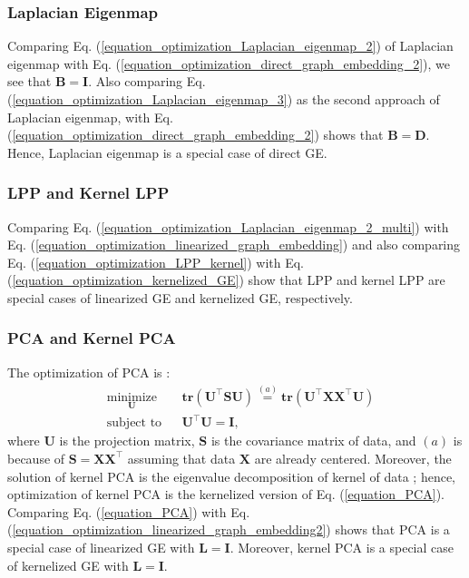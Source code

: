 \documentclass[lang=cn,10pt]{gorgeousnbook}
\numberwithin{equation}{section}%
\numberwithin{figure}{section}%
\begin{document}
\subsubsection{Laplacian Eigenmap}

Comparing Eq. (\ref{equation_optimization_Laplacian_eigenmap_2}) of Laplacian eigenmap with Eq. (\ref{equation_optimization_direct_graph_embedding_2}), we see that $\boldsymbol{B} = \boldsymbol{I}$. Also comparing Eq. (\ref{equation_optimization_Laplacian_eigenmap_3}) as the second approach of Laplacian eigenmap, with Eq. (\ref{equation_optimization_direct_graph_embedding_2}) shows that $\boldsymbol{B} = \boldsymbol{D}$. Hence, Laplacian eigenmap is a special case of direct GE.

\subsubsection{LPP and Kernel LPP}

Comparing Eq. (\ref{equation_optimization_Laplacian_eigenmap_2_multi}) with Eq. (\ref{equation_optimization_linearized_graph_embedding}) and also comparing Eq. (\ref{equation_optimization_LPP_kernel}) with Eq. (\ref{equation_optimization_kernelized_GE}) show that LPP and kernel LPP are special cases of linearized GE and kernelized GE, respectively. 

\subsubsection{PCA and Kernel PCA}

The optimization of PCA is \cite{ghojogh2019unsupervised}:
\begin{equation}\label{equation_PCA}
\begin{aligned}
& \underset{\boldsymbol{U}}{\text{minimize}}
& & \textbf{tr}(\boldsymbol{U}^\top \boldsymbol{S} \boldsymbol{U}) \overset{(a)}{=} \textbf{tr}(\boldsymbol{U}^\top \boldsymbol{X} \boldsymbol{X}^\top \boldsymbol{U}) \\
& \text{subject to}
& & 
\boldsymbol{U}^\top \boldsymbol{U} = \boldsymbol{I},
\end{aligned}
\end{equation}
where $\boldsymbol{U}$ is the projection matrix, $\boldsymbol{S}$ is the covariance matrix of data, and $(a)$ is because of $\boldsymbol{S} = \boldsymbol{X} \boldsymbol{X}^\top$ assuming that data $\boldsymbol{X}$ are already centered. 
Moreover, the solution of kernel PCA is the eigenvalue decomposition of kernel of data \cite{ghojogh2019unsupervised}; hence, optimization of kernel PCA is the kernelized version of Eq. (\ref{equation_PCA}). 
Comparing Eq. (\ref{equation_PCA}) with Eq. (\ref{equation_optimization_linearized_graph_embedding2}) shows that PCA is a special case of linearized GE with $\boldsymbol{L}=\boldsymbol{I}$. Moreover, kernel PCA is a special case of kernelized GE with $\boldsymbol{L} = \boldsymbol{I}$. 
\end{document}
